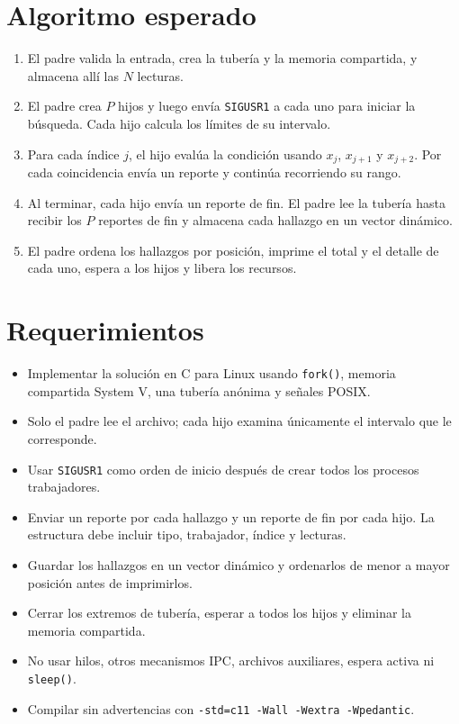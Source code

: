 \documentclass[12pt,a4paper]{article}
\begin{document}
\section*{Algoritmo esperado}
{\small
\begin{enumerate}[itemsep=0.15em, topsep=0.2em]
    \item El padre valida la entrada, crea la tubería y la memoria compartida, y almacena allí las $N$ lecturas.
    \item El padre crea $P$ hijos y luego envía \texttt{SIGUSR1} a cada uno para iniciar la búsqueda. Cada hijo calcula los límites de su intervalo.
    \item Para cada índice $j$, el hijo evalúa la condición usando $x_j$, $x_{j+1}$ y $x_{j+2}$. Por cada coincidencia envía un reporte y continúa recorriendo su rango.
    \item Al terminar, cada hijo envía un reporte de fin. El padre lee la tubería hasta recibir los $P$ reportes de fin y almacena cada hallazgo en un vector dinámico.
    \item El padre ordena los hallazgos por posición, imprime el total y el detalle de cada uno, espera a los hijos y libera los recursos.
\end{enumerate}
}

\section*{Requerimientos}
{\small
\begin{itemize}[itemsep=0.3em]
    \item Implementar la solución en C para Linux usando \texttt{fork()}, memoria compartida System V, una tubería anónima y señales POSIX.
    \item Solo el padre lee el archivo; cada hijo examina únicamente el intervalo que le corresponde.
    \item Usar \texttt{SIGUSR1} como orden de inicio después de crear todos los procesos trabajadores.
    \item Enviar un reporte por cada hallazgo y un reporte de fin por cada hijo. La estructura debe incluir tipo, trabajador, índice y lecturas.
    \item Guardar los hallazgos en un vector dinámico y ordenarlos de menor a mayor posición antes de imprimirlos.
    \item Cerrar los extremos de tubería, esperar a todos los hijos y eliminar la memoria compartida.
    \item No usar hilos, otros mecanismos IPC, archivos auxiliares, espera activa ni \texttt{sleep()}.
    \item Compilar sin advertencias con \texttt{-std=c11 -Wall -Wextra -Wpedantic}.
\end{itemize}
}
\end{document}

